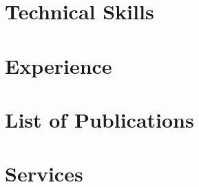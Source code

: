 \documentclass[]{res}
\begin{document}
\begin{resume}
\section{Technical Skills}
\vspace*{0.1in}


\section{Experience}
\vspace*{0.2in} 



%


\section{List of Publications}
\vspace*{0.2in}


%

%
\section{Services}
\vspace*{0.2in}

\end{resume}
\end{document}
